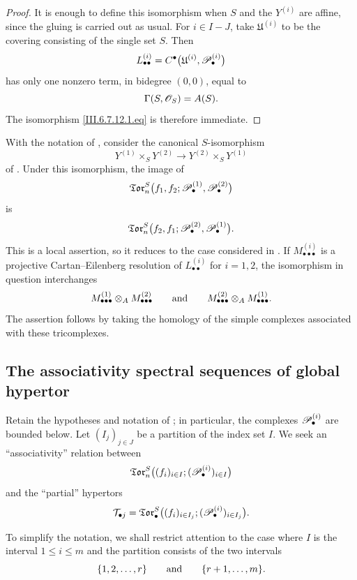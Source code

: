 \begin{proof}
It is enough to define this isomorphism when $S$ and the
$Y^{(i)}$ are affine, since the gluing is carried out as usual.
For $i\in I-J$, take $\mathfrak U^{(i)}$ to be the covering
consisting of the single set $S$.  Then
\[
  L_{\bullet\bullet}^{(i)}
  =
  C^\bullet
  \bigl(
    \mathfrak U^{(i)},\mathscr{P}_\bullet^{(i)}
  \bigr)
\]
has only one nonzero term, in bidegree $(0,0)$, equal to
\[
  \Gamma(S,\mathscr{O}_S)=A(S).
\]
The isomorphism \eqref{III.6.7.12.1.eq} is therefore immediate.
\end{proof}

\begin{remark}[6.7.13]
\label{III.6.7.13}
With the notation of , consider the canonical
$S$-isomorphism
\[
  Y^{(1)}\times_SY^{(2)}
  \longrightarrow
  Y^{(2)}\times_SY^{(1)}
\]
of .  Under this isomorphism, the image of
\[
  \mathfrak{Tor}_n^S
  \bigl(
    f_1,f_2;
    \mathscr{P}_\bullet^{(1)},\mathscr{P}_\bullet^{(2)}
  \bigr)
\]
is
\[
  \mathfrak{Tor}_n^S
  \bigl(
    f_2,f_1;
    \mathscr{P}_\bullet^{(2)},\mathscr{P}_\bullet^{(1)}
  \bigr).
\]
This is a local assertion, so it reduces to the case considered in
.  If
$M_{\bullet\bullet\bullet}^{(i)}$ is a projective
Cartan--Eilenberg resolution of $L_{\bullet\bullet}^{(i)}$ for
$i=1,2$, the isomorphism in question interchanges
\[
  M_{\bullet\bullet\bullet}^{(1)}
  \otimes_A
  M_{\bullet\bullet\bullet}^{(2)}
  \qquad\hbox{and}\qquad
  M_{\bullet\bullet\bullet}^{(2)}
  \otimes_A
  M_{\bullet\bullet\bullet}^{(1)}.
\]
The assertion follows by taking the homology of the simple
complexes associated with these tricomplexes.
\end{remark}

\subsection{The associativity spectral sequences of global hypertor}
\label{subsection:III.6.8}
\label{III.6.8}

\begin{env}[6.8.1]
\label{III.6.8.1}
Retain the hypotheses and notation of ; in
particular, the complexes $\mathscr{P}_\bullet^{(i)}$ are bounded
below.  Let $(I_j)_{j\in J}$ be a partition of the index set $I$.
We seek an ``associativity'' relation between
\[
  \mathfrak{Tor}_n^S
  \bigl(
    (f_i)_{i\in I};
    (\mathscr{P}_\bullet^{(i)})_{i\in I}
  \bigr)
\]
and the ``partial'' hypertors
\[
  \mathcal T_{\bullet j}
  =
  \mathfrak{Tor}_\bullet^S
  \bigl(
    (f_i)_{i\in I_j};
    (\mathscr{P}_\bullet^{(i)})_{i\in I_j}
  \bigr).
\]

To simplify the notation, we shall restrict attention to the case
where $I$ is the interval $1\leq i\leq m$ and the partition
consists of the two intervals
\[
  \{1,2,\ldots,r\}
  \qquad\hbox{and}\qquad
  \{r+1,\ldots,m\}.
\]
\end{env}

